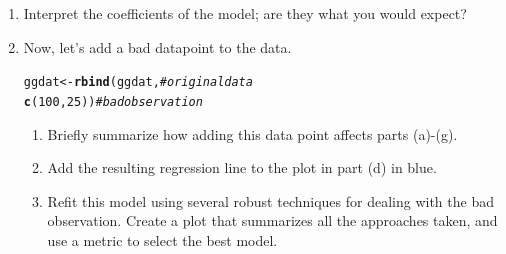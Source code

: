 \documentclass{article}\usepackage[]{graphicx}\usepackage[]{color}
\makeatletter
\newcommand{\hlnum}[1]{\textcolor[rgb]{0.686,0.059,0.569}{#1}}%
\newcommand{\hlcom}[1]{\textcolor[rgb]{0.678,0.584,0.686}{\textit{#1}}}%
\newcommand{\hlstd}[1]{\textcolor[rgb]{0.345,0.345,0.345}{#1}}%
\newcommand{\hlkwb}[1]{\textcolor[rgb]{0.69,0.353,0.396}{#1}}%
\newcommand{\hlkwd}[1]{\textcolor[rgb]{0.737,0.353,0.396}{\textbf{#1}}}%
\newenvironment{kframe}{%
 \def\at@end@of@kframe{}%
 \ifinner\ifhmode%
  \def\at@end@of@kframe{\end{minipage}}%
  \begin{minipage}{\columnwidth}%
 \fi\fi%
 \def\FrameCommand##1{\hskip\@totalleftmargin \hskip-\fboxsep
 \colorbox{shadecolor}{##1}\hskip-\fboxsep
     \hskip-\linewidth \hskip-\@totalleftmargin \hskip\columnwidth}%
 \MakeFramed {\advance\hsize-\width
   \@totalleftmargin\z@ \linewidth\hsize
   \@setminipage}}%
 {\par\unskip\endMakeFramed%
 \at@end@of@kframe}
\newenvironment{knitrout}{}{} %
\makeatother
\begin{document}
\begin{enumerate}
\begin{enumerate}
    \item Interpret the coefficients of the model; are they what you would expect?

    \item Now, let's add a bad datapoint to the data.
\begin{knitrout}
\color{fgcolor}\begin{kframe}
\begin{alltt}
\hlstd{ggdat} \hlkwb{<-} \hlkwd{rbind}\hlstd{(ggdat,}     \hlcom{# original data}
               \hlkwd{c}\hlstd{(}\hlnum{100}\hlstd{,}\hlnum{25}\hlstd{))} \hlcom{# bad observation}
\end{alltt}
\end{kframe}
\end{knitrout}
  \begin{enumerate}
    \item Briefly summarize how adding this data point affects parts (a)-(g).
    \item Add the resulting regression line to the plot in part (d) in blue.
    \item Refit this model using several robust techniques for dealing with the
    bad observation. Create a plot that summarizes all the approaches taken, and 
    use a metric to select the best model.
  \end{enumerate}
  \end{enumerate}
\end{enumerate}
\newpage

\end{document}
